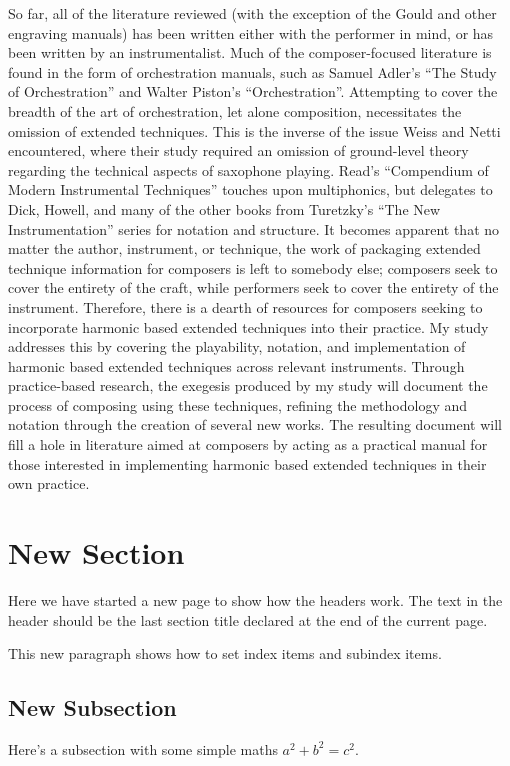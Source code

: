 So far, all of the literature reviewed (with the exception of the Gould and other engraving manuals) has been written either with the performer in mind, or has been written by an instrumentalist. Much of the composer-focused literature is found in the form of orchestration manuals, such as Samuel Adler’s “The Study of Orchestration” and Walter Piston’s “Orchestration”.  Attempting to cover the breadth of the art of orchestration, let alone composition, necessitates the omission of extended techniques. This is the inverse of the issue Weiss and Netti encountered, where their study required an omission of ground-level theory regarding the technical aspects of saxophone playing. Read’s “Compendium of Modern Instrumental Techniques” touches upon multiphonics, but delegates to Dick, Howell, and many of the other books from Turetzky’s “The New Instrumentation” series for notation and structure.  It becomes apparent that no matter the author, instrument, or technique, the work of packaging extended technique information for composers is left to somebody else; composers seek to cover the entirety of the craft, while performers seek to cover the entirety of the instrument. Therefore, there is a dearth of resources for composers seeking to incorporate harmonic based extended techniques into their practice. My study addresses this by covering the playability, notation, and implementation of harmonic based extended techniques across relevant instruments. Through practice-based research, the exegesis produced by my study will document the process of composing using these techniques, refining the methodology and notation through the creation of several new works. The resulting document will fill a hole in literature aimed at composers by acting as a practical manual for those interested in implementing harmonic based extended techniques in their own practice.


\newpage
\section{New Section}
Here we have started a new page to show how the headers work. The
text in the header should be the last section title declared at
the end of the current page.

This new paragraph shows how to set index items
and  subindex items.

\subsection{New Subsection}
Here's a subsection with some simple maths $a^2+b^2=c^2$.

